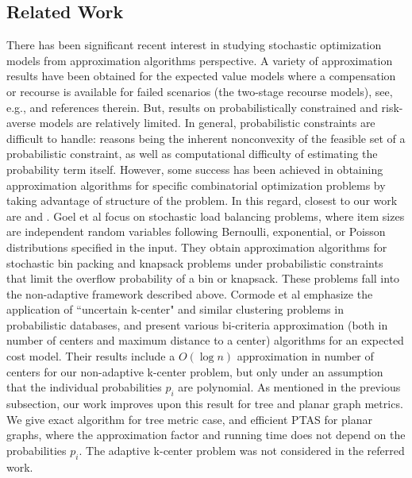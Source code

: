 \documentclass[11pt,onecolumn]{article}
\begin{document}
\subsection{Related Work}
There has been significant recent interest in studying stochastic optimization models from approximation algorithms perspective. A variety of approximation results have been obtained for the expected value models where a compensation or recourse is available for failed scenarios (the two-stage recourse models), see, e.g., \cite{swamy-survey} and references therein. 
But, results on probabilistically constrained and risk-averse models are relatively limited. In general, probabilistic constraints are difficult to handle: reasons being the inherent nonconvexity of the feasible set of a probabilistic constraint, as well as computational difficulty of estimating the probability term itself. However, some success has been achieved in obtaining approximation algorithms for specific combinatorial optimization problems by taking advantage of structure of the problem. In this regard, closest to our work are \cite{goel99stochastic} and \cite{cormode-pods07}.  
Goel et al \cite{goel99stochastic} focus on stochastic load balancing problems,
where item sizes are independent random variables following Bernoulli, exponential, or Poisson distributions specified in the input. They obtain approximation algorithms for stochastic bin packing and knapsack problems under probabilistic constraints that limit the overflow probability of a bin or knapsack.  These problems fall into the non-adaptive framework described above. Cormode et al \cite{cormode-pods07} emphasize the application of ``uncertain k-center" and similar clustering problems in probabilistic databases, and present various bi-criteria approximation (both in number of centers and maximum distance to a center) algorithms for an expected cost model. Their results include a $O(\log n)$ approximation in number of centers for our non-adaptive k-center problem, but only under an assumption that the individual probabilities $p_i$ are polynomial. As mentioned in the previous subsection, our work improves upon this result for tree and planar graph metrics. We give exact algorithm for tree metric case, and efficient PTAS for planar graphs, where the approximation factor and running time does not depend on the probabilities $p_i$. The adaptive k-center problem was not considered in the referred work.
\end{document}
